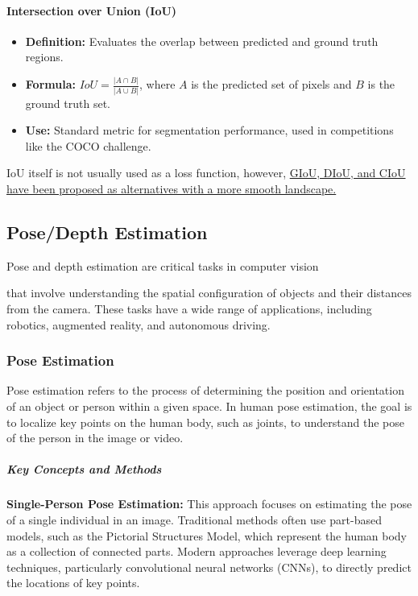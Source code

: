\documentclass[12pt]{article}
\begin{document}
\paragraph{Intersection over Union (IoU)}
\begin{itemize}
    \item \textbf{Definition:} Evaluates the overlap between predicted and ground truth regions.
    \item \textbf{Formula:} \(IoU = \frac{|A \cap B|}{|A \cup B|}\), where \(A\) is the predicted set of pixels and \(B\) is the ground truth set.
    \item \textbf{Use:} Standard metric for segmentation performance, used in competitions like the COCO challenge.
\end{itemize}

IoU itself is not usually used as a loss function, however, \href{https://learnopencv.com/iou-loss-functions-object-detection/#ciou-complete-iou-loss}{GIoU, DIoU, and CIoU have been proposed as alternatives with a more smooth landscape.}

\subsection{Pose/Depth Estimation}

Pose and depth estimation are critical tasks in computer vision

 that involve understanding the spatial configuration of objects and their distances from the camera. These tasks have a wide range of applications, including robotics, augmented reality, and autonomous driving.

\subsubsection{Pose Estimation}

Pose estimation refers to the process of determining the position and orientation of an object or person within a given space. In human pose estimation, the goal is to localize key points on the human body, such as joints, to understand the pose of the person in the image or video.

\subparagraph{Key Concepts and Methods}

\textbf{Single-Person Pose Estimation:} This approach focuses on estimating the pose of a single individual in an image. Traditional methods often use part-based models, such as the Pictorial Structures Model, which represent the human body as a collection of connected parts. Modern approaches leverage deep learning techniques, particularly convolutional neural networks (CNNs), to directly predict the locations of key points.
\end{document}
